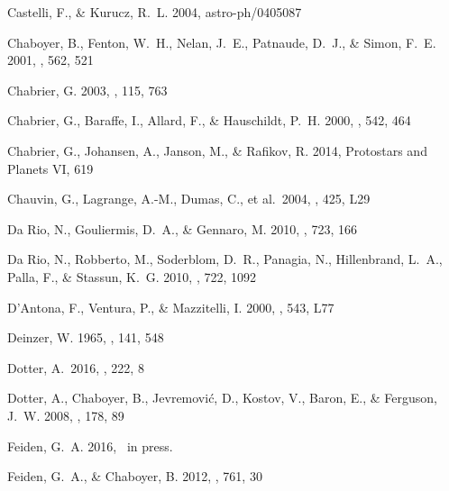 \begin{thebibliography}{56}
{Castelli}, F., \& {Kurucz}, R.~L. 2004, astro-ph/0405087

Chaboyer, B., Fenton, W.~H., Nelan, J.~E., Patnaude, D.~J., \& Simon, F.~E.
  2001, \apj, 562, 521

{Chabrier}, G. 2003, \pasp, 115, 763

Chabrier, G., Baraffe, I., Allard, F., \& Hauschildt, P.~H. 2000, \apj, 542,
  464

Chabrier, G., Johansen, A., Janson, M., \& Rafikov, R. 2014, Protostars and
  Planets VI, 619
  
 Chauvin, G., Lagrange, A.-M., Dumas, C., et al.\ 2004, \aap, 425, L29

{Da Rio}, N., {Gouliermis}, D.~A., \& {Gennaro}, M. 2010{}, \apj,
  723, 166

{Da Rio}, N., {Robberto}, M., {Soderblom}, D.~R., {Panagia}, N., {Hillenbrand},
  L.~A., {Palla}, F., \& {Stassun}, K.~G. 2010{}, \apj, 722, 1092

{D'Antona}, F., {Ventura}, P., \& {Mazzitelli}, I. 2000, \apj, 543, L77

{Deinzer}, W. 1965, \apj, 141, 548

 Dotter, A.\ 2016, \apjs, 222, 8 

Dotter, A., Chaboyer, B., Jevremovi\'{c}, D., Kostov, V., Baron, E., \&
  Ferguson, J.~W. 2008, \apjs, 178, 89

{Feiden}, G.~A. 2016, \aap\ in press.

{Feiden}, G.~A., \& {Chaboyer}, B. 2012, \apj, 761, 30


\end{thebibliography}
